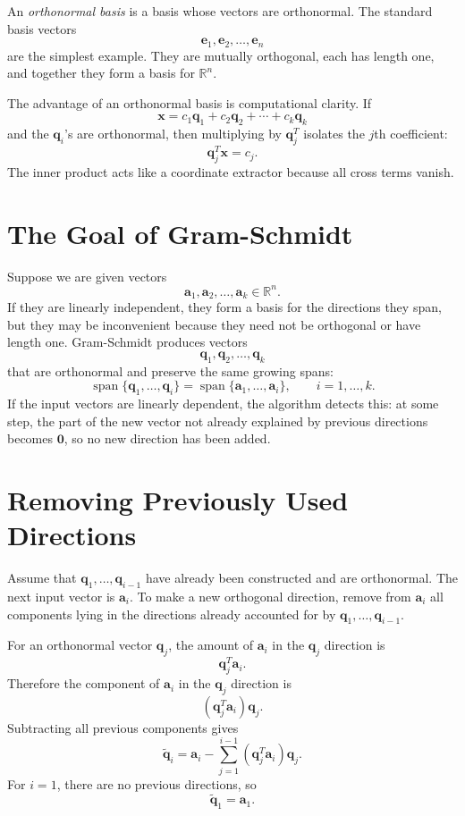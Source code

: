 An \emph{orthonormal basis} is a basis whose vectors are orthonormal. The standard basis vectors
\[
    \mathbf{e}_1,\mathbf{e}_2,\ldots,\mathbf{e}_n
\]
are the simplest example. They are mutually orthogonal, each has length one, and together they form a basis for \(\mathbb{R}^n\).

The advantage of an orthonormal basis is computational clarity. If
\[
    \mathbf{x}=c_1\mathbf{q}_1+c_2\mathbf{q}_2+\cdots+c_k\mathbf{q}_k
\]
and the \(\mathbf{q}_i\)'s are orthonormal, then multiplying by \(\mathbf{q}_j^T\) isolates the \(j\)th coefficient:
\[
    \mathbf{q}_j^T\mathbf{x}=c_j.
\]
The inner product acts like a coordinate extractor because all cross terms vanish.


\section{The Goal of Gram-Schmidt}
\label{mf:gram-schmidt-goal}

Suppose we are given vectors
\[
    \mathbf{a}_1,\mathbf{a}_2,\ldots,\mathbf{a}_k\in\mathbb{R}^n.
\]
If they are linearly independent, they form a basis for the directions they span, but they may be inconvenient because they need not be orthogonal or have length one. Gram-Schmidt produces vectors
\[
    \mathbf{q}_1,\mathbf{q}_2,\ldots,\mathbf{q}_k
\]
that are orthonormal and preserve the same growing spans:
\[
    \operatorname{span}\{\mathbf{q}_1,\ldots,\mathbf{q}_i\}
    =
    \operatorname{span}\{\mathbf{a}_1,\ldots,\mathbf{a}_i\},
    \qquad i=1,\ldots,k.
\]
If the input vectors are linearly dependent, the algorithm detects this: at some step, the part of the new vector not already explained by previous directions becomes \(\mathbf{0}\), so no new direction has been added.

\section{Removing Previously Used Directions}
\label{mf:gram-schmidt}

Assume that \(\mathbf{q}_1,\ldots,\mathbf{q}_{i-1}\) have already been constructed and are orthonormal. The next input vector is \(\mathbf{a}_i\). To make a new orthogonal direction, remove from \(\mathbf{a}_i\) all components lying in the directions already accounted for by \(\mathbf{q}_1,\ldots,\mathbf{q}_{i-1}\).

For an orthonormal vector \(\mathbf{q}_j\), the amount of \(\mathbf{a}_i\) in the \(\mathbf{q}_j\) direction is
\[
    \mathbf{q}_j^T\mathbf{a}_i.
\]
Therefore the component of \(\mathbf{a}_i\) in the \(\mathbf{q}_j\) direction is
\[
    (\mathbf{q}_j^T\mathbf{a}_i)\mathbf{q}_j.
\]
Subtracting all previous components gives
\[
    \widetilde{\mathbf{q}}_i
    =
    \mathbf{a}_i
    -
    \sum_{j=1}^{i-1}(\mathbf{q}_j^T\mathbf{a}_i)\mathbf{q}_j.
\]
For \(i=1\), there are no previous directions, so
\[
    \widetilde{\mathbf{q}}_1=\mathbf{a}_1.
\]

